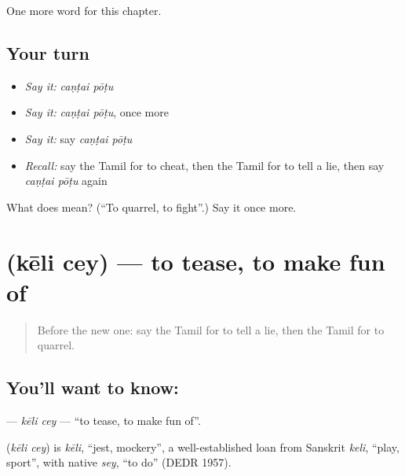 \begin{grammarlens}[title={What you've built}]
One more word for this chapter.
\end{grammarlens}

\subsection*{Your turn}
\begin{itemize}
\raggedright
  \item \emph{Say it:} \emph{caṇṭai pōṭu}
  \item \emph{Say it:} \emph{caṇṭai pōṭu}, once more
  \item \emph{Say it:} say \emph{caṇṭai pōṭu}
  \item \emph{Recall:} say the Tamil for to cheat, then the Tamil for to tell a lie, then say \emph{caṇṭai pōṭu} again
\end{itemize}

\begin{tcolorbox}[breakable,colback=teal!4,colframe=teal!35!black,title={Before you move on}]
What does   mean? (\textquotedblleft{}To quarrel, to fight\textquotedblright{}.) Say it once more.
\end{tcolorbox}
\section[\texorpdfstring{\ta{கேலி} \ta{செய்} (kēli cey)}{கேலி செய் (kēli cey)}]{  (kēli cey) — to tease, to make fun of}

\label{lesson:TA-C198-keli-cey}



\begin{quote}
Before the new one: say the Tamil for to tell a lie, then the Tamil for to quarrel.
\end{quote}

\subsection*{You'll want to know:  }
\textbf{ } — \emph{kēli cey} — \textquotedblleft{}to tease, to make fun of\textquotedblright{}.

\begin{cousinweb}
\textbf{ } (\emph{kēli cey}) is \emph{kēli}, \textquotedblleft{}jest, mockery\textquotedblright{}, a well-established loan from Sanskrit \emph{keli}, \textquotedblleft{}play, sport\textquotedblright{}, with native \emph{sey}, \textquotedblleft{}to do\textquotedblright{} (DEDR 1957).
\end{cousinweb}

